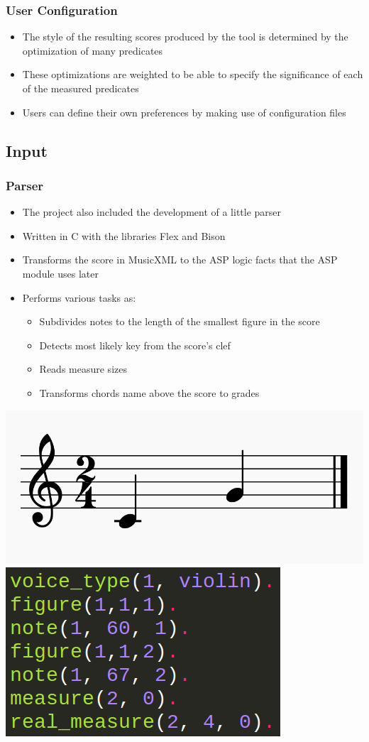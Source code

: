 \documentclass[english]{beamer}
\begin{document}
	\begin{frame}
	\frametitle{User Configuration}
		\begin{itemize}
			\item The style of the resulting scores produced by the tool is determined by the optimization of many predicates
			\item These optimizations are weighted to be able to specify the significance of each of the measured predicates
			\item Users can define their own preferences by making use of configuration files
		\end{itemize}
	\end{frame}
\subsection{Input}
	\begin{frame}
	\frametitle{Parser}
		\begin{itemize}
			\item The project also included the development of a little parser
			\item Written in C with the libraries Flex and Bison
			\item Transforms the score in MusicXML to the ASP logic facts that the ASP module uses later
			\item Performs various tasks as:
				\begin{itemize}
					\item Subdivides notes to the length of the smallest figure in the score
					\item Detects most likely key from the score's clef
					\item Reads measure sizes
					\item Transforms chords name above the score to grades
				\end{itemize}
		\end{itemize}
				\begin{center}
						\includegraphics[width=0.39\linewidth]{imagenes/example_notes.png}
						\includegraphics[width=0.39\linewidth]{imagenes/logic_facts_score.png}
				\end{center}
	\end{frame}
\end{document}
